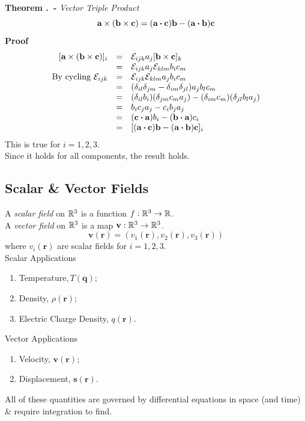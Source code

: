 \documentclass[11pt,a4paper]{article}
\begin{document}
 \textbf{Theorem .\ - }\textit{Vector Triple Product}
$$\textbf{a}\times(\textbf{b}\times\textbf{c}) = (\textbf{a}\boldsymbol{\cdot}\textbf{c})\textbf{b}-(\textbf{a}\boldsymbol{\cdot}\textbf{b})\textbf{c}$$
\textbf{Proof}
\[\begin{array}{rcl}
[\textbf{a}\times(\textbf{b}\times\textbf{c})]_i &=& \mathcal{E}_{ijk} a_j[\textbf{b}\times\textbf{c}]_k\\
&=& \mathcal{E}_{ijk}a_j \mathcal{E}_{klm} b_i c_m\\
\mathrm{By\ cycling\ } \mathcal{E}_{ijk}&=& \mathcal{E}_{ijk} \mathcal{E}_{klm} a_j b_i c_m\\
&=&(\delta_{il}\delta_{jm}-\delta_{im}\delta_{jl})a_jb_lc_m\\
&=&(\delta_{il}b_i)(\delta_{jm}c_ma_j)-(\delta_{im}c_m)(\delta_{jl}b_la_j)\\
&=&b_ic_ja_j-c_ib_ja_j\\
&=&(\textbf{c}\boldsymbol{\cdot}\textbf{a})b_i-(\textbf{b}\boldsymbol{\cdot}\textbf{a})c_i\\
&=&[(\textbf{a}\boldsymbol{\cdot}\textbf{c})\textbf{b}-(\textbf{a}\boldsymbol{\cdot}\textbf{b})\textbf{c}]_i
\end{array}\]
This is true for $i=1,2,3$.\\
Since it holds for all components, the result holds.

\subsection{Scalar \& Vector Fields}

A \textit{scalar field} on $\mathbb{R}^3$ is a function $f : \mathbb{R}^3\to\mathbb{R}$.\\

A \textit{vector field} on $\mathbb{R}^3$ is a map $\textbf{v} : \mathbb{R}^3\to\mathbb{R}^3$.
$$\textbf{v}(\textbf{r})=(v_1(\textbf{r}), v_2(\textbf{r}), v_3(\textbf{r}))$$
where $v_i(\textbf{r})$ are scalar fields for $i=1,2,3$.\\

Scalar Applications
\begin{enumerate}[label=\roman*)]
  \item Temperature$, T(\textbf{q})$;
  \item Density, $\rho(\textbf{r})$;
  \item Electric Charge Density, $q(\textbf{r})$.
\end{enumerate}
Vector Applications
\begin{enumerate}[label=\roman*)]
  \item Velocity, $\textbf{v}(\textbf{r})$;
  \item Displacement, $\textbf{s}(\textbf{r})$.
\end{enumerate}
All of these quantities are governed by differential equations in space (and time) \& require integration to find.
\end{document}
